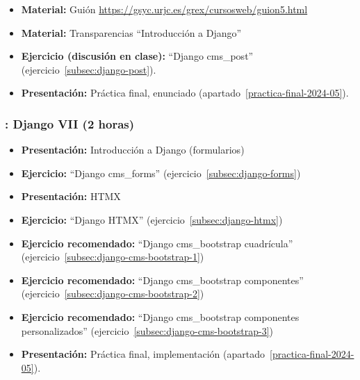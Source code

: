 \documentclass[a4paper,12pt]{article}
\begin{document}
\begin{itemize}

 \item \textbf{Material:} Guión \url{https://gsyc.urjc.es/grex/cursosweb/guion5.html}
 \item \textbf{Material:} Transparencias ``Introducción a Django''
 \item \textbf{Ejercicio (discusión en clase):} ``Django cms\_post'' (ejercicio~\ref{subsec:django-post}).
\item \textbf{Presentación:} Práctica final, enunciado (apartado~\ref{practica-final-2024-05}).
\end{itemize}

\subsubsection{\juevesM: Django VII (2 horas)}
\label{cal:juevesM}

\begin{itemize}
  \item \textbf{Presentación:} Introducción a Django (formularios)
  \item \textbf{Ejercicio:} ``Django cms\_forms'' (ejercicio~\ref{subsec:django-forms}) \\
  \item \textbf{Presentación:} HTMX
  \item \textbf{Ejercicio:} ``Django HTMX'' (ejercicio~\ref{subsec:django-htmx})
  \item \textbf{Ejercicio recomendado:} ``Django cms\_bootstrap cuadrícula'' (ejercicio~\ref{subsec:django-cms-bootstrap-1})
   \item \textbf{Ejercicio recomendado:} ``Django cms\_bootstrap componentes'' (ejercicio~\ref{subsec:django-cms-bootstrap-2})
   \item \textbf{Ejercicio recomendado:} ``Django cms\_bootstrap componentes personalizados'' (ejercicio~\ref{subsec:django-cms-bootstrap-3})
\item \textbf{Presentación:} Práctica final, implementación (apartado~\ref{practica-final-2024-05}).
\end{itemize}
\end{document}
